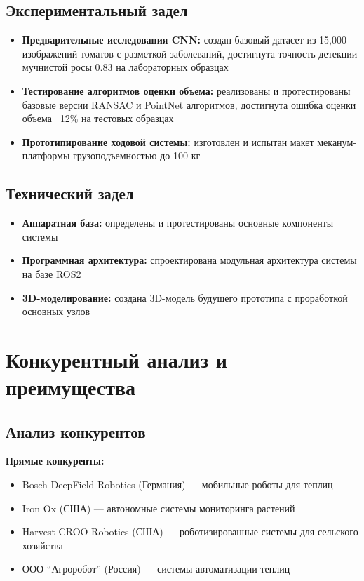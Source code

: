 \documentclass[12pt,a4paper]{article}
\begin{document}
\subsection{Экспериментальный задел}
\begin{itemize}
    \item \textbf{Предварительные исследования CNN:} создан базовый датасет из 15,000 изображений томатов с разметкой заболеваний, достигнута точность детекции мучнистой росы 0.83 на лабораторных образцах
    \item \textbf{Тестирование алгоритмов оценки объема:} реализованы и протестированы базовые версии RANSAC и PointNet алгоритмов, достигнута ошибка оценки объема ~12\% на тестовых образцах
    \item \textbf{Прототипирование ходовой системы:} изготовлен и испытан макет меканум-платформы грузоподъемностью до 100 кг
\end{itemize}

\subsection{Технический задел}
\begin{itemize}
    \item \textbf{Аппаратная база:} определены и протестированы основные компоненты системы
    \item \textbf{Программная архитектура:} спроектирована модульная архитектура системы на базе ROS2
    \item \textbf{3D-моделирование:} создана 3D-модель будущего прототипа с проработкой основных узлов
\end{itemize}

\section{Конкурентный анализ и преимущества}

\subsection{Анализ конкурентов}
\textbf{Прямые конкуренты:}
\begin{itemize}
    \item Bosch DeepField Robotics (Германия) — мобильные роботы для теплиц
    \item Iron Ox (США) — автономные системы мониторинга растений
    \item Harvest CROO Robotics (США) — роботизированные системы для сельского хозяйства
    \item ООО ``Агроробот'' (Россия) — системы автоматизации теплиц
\end{itemize}
\end{document}
